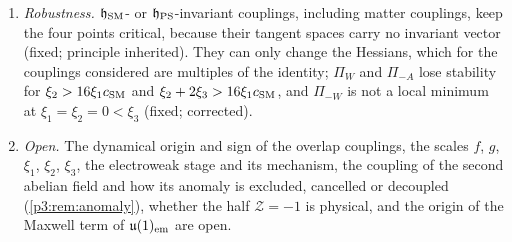 \begin{enumerate}[label=(\alph*),leftmargin=2.2em]
$-\xi_3\Tr(\Pi\Pfam)$, which selects $\Pi_A$ (constructed). With only alignment ($\xi_2=\xi_3=0$) the four points need $\xi_1>0$, and at $\xi_1=0$ every point
is a minimum. The selected $\Pi_A$ preserves all of $\mathfrak h_{\rm SM}$: it is the electroweak-symmetric point, not the observed vacuum, and the
adopted potential opposes the neutral electroweak deformation (\cref{p3:prop:neutral}).
\item \emph{Robustness.} $\mathfrak h_{\rm SM}$- or $\mathfrak h_{\rm PS}$-invariant couplings, including matter couplings, keep the four points critical, because their
tangent spaces carry no invariant vector (fixed; principle inherited). They can only change the Hessians, which for the couplings considered are multiples of the identity;
$\Pi_W$ and $\Pi_{-A}$ lose stability for $\xi_2>16\xi_1 c_{\rm SM}$ and $\xi_2+2\xi_3>16\xi_1 c_{\rm SM}$, and $\Pi_{-W}$ is not a local minimum at
$\xi_1=\xi_2=0<\xi_3$ (fixed; corrected).
\item \emph{Open.} The dynamical origin and sign of the overlap couplings, the scales $f$, $g$, $\xi_1$, $\xi_2$, $\xi_3$, the electroweak stage and its mechanism, the coupling of the second abelian field and how its anomaly is
excluded, cancelled or decoupled (\cref{p3:rem:anomaly}), whether the
half $\mathcal Z=-1$ is physical, and the origin of the Maxwell term of $\mathfrak{u}(1)_{\rm em}$ are open.
\end{enumerate}

